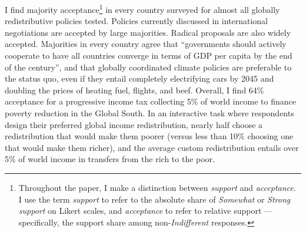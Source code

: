 \documentclass[12pt,english]{article}
\begin{document}
\begin{bibunit}
I find majority acceptance\footnote{Throughout the paper, I make a distinction between \textit{support} and \textit{acceptance}. I use the term \textit{support} to refer to the absolute share of \textit{Somewhat} or \textit{Strong support} on Likert scales, and \textit{acceptance} to refer to relative support ---specifically, the support share among non-\textit{Indifferent} responses.} in every country surveyed for almost all globally redistributive policies tested. Policies currently discussed in international negotiations are accepted by large majorities. %
Radical proposals are also widely accepted. Majorities in every country agree that ``governments should actively cooperate to have all countries converge in terms of GDP per capita by the end of the century'', and that globally coordinated climate policies are preferable to the status quo, even if they entail completely electrifying cars by 2045 and doubling the prices of heating fuel, flights, and beef. Overall, I find 64\% acceptance for a progressive income tax collecting 5\% of world income to finance poverty reduction in the Global South. %
In an interactive task where respondents design their preferred global income redistribution, nearly half choose a redistribution that would make them poorer (versus less than 10\% choosing one that would make them richer), and the average custom redistribution entails over 5\% of world income in transfers from the rich to the poor.



\end{bibunit}
\end{document}

